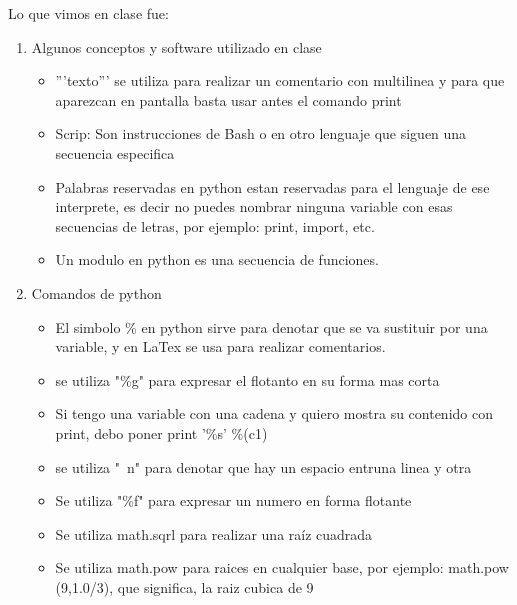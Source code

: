 \documentclass[letterpaper, 12pt, oneside]{article}%
\begin{document}
Lo que vimos en clase fue:%
\begin{enumerate}%
	\item Algunos conceptos y software utilizado en clase%
		\begin{itemize}
			\item '''texto''' se utiliza para realizar un comentario con multilinea y para que aparezcan en pantalla basta usar antes el comando print 			
			\item Scrip: Son instrucciones de Bash o en otro lenguaje que siguen una secuencia especifica			
			\item Palabras reservadas en python estan reservadas para el lenguaje de ese interprete, es decir no puedes nombrar ninguna variable con esas secuencias de letras, por ejemplo: print, import, etc.
			\item Un modulo en python es una secuencia de funciones.
		\end{itemize}
	
	\item Comandos de python%
	\begin{itemize}%
		\item El simbolo \% en python sirve para denotar que se va sustituir por una variable, y en LaTex se usa para realizar comentarios.
		\item se utiliza "\%g" para expresar el flotanto en su forma mas corta
		\item Si tengo una variable con una cadena y quiero mostra su contenido con print, debo poner print '\%s' \%(c1)
		\item se utiliza "\ n" para denotar que hay un espacio entruna linea y otra
		\item Se utiliza "\%f" para expresar un numero en forma flotante
		\item Se utiliza math.sqrl para realizar una raíz cuadrada
		\item Se utiliza math.pow para raices en cualquier base, por ejemplo: math.pow (9,1.0/3), que significa, la raiz cubica de 9
		

\end{itemize}
\end{enumerate}
\end{document}
